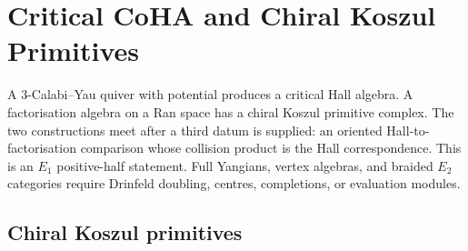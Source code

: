 \providecommand{\CoHA}{\mathrm{CoHA}}
\providecommand{\Prim}{\mathrm{Prim}}
\providecommand{\coLie}{\mathrm{coLie}}
\providecommand{\Bar}{\mathrm{Bar}}
\providecommand{\coBar}{\Omega}
\providecommand{\Ran}{\mathrm{Ran}}
\providecommand{\Fact}{\mathrm{Fact}}
\providecommand{\Chiral}{\mathrm{Chiral}}
\providecommand{\Lie}{\mathrm{Lie}}
\providecommand{\Crit}{\mathrm{Crit}}
\providecommand{\Jac}{\mathrm{Jac}}
\providecommand{\BPS}{\mathrm{BPS}}
\providecommand{\BM}{\mathrm{BM}}
\providecommand{\Rep}{\mathrm{Rep}}
\providecommand{\GL}{\mathrm{GL}}
\providecommand{\DDrin}{\mathcal{D}}
\providecommand{\Mm}{\mathfrak{M}}
\providecommand{\Ff}{\mathcal{F}}
\providecommand{\Hh}{\mathcal{H}}
\providecommand{\Yplus}{Y^{+}}
\providecommand{\cW}{\mathcal{W}}
\providecommand{\cZ}{\mathcal{Z}}
\providecommand{\Oo}{\mathcal{O}}
\providecommand{\C}{\mathbb{C}}
\providecommand{\Z}{\mathbb{Z}}
\providecommand{\QQ}{\mathbb{Q}}
\providecommand{\Eone}{E_{1}}
\providecommand{\Etwo}{E_{2}}
\providecommand{\kch}{\kappa_{\mathrm{ch}}}
\providecommand{\kcat}{\kappa_{\mathrm{cat}}}
\providecommand{\kBKM}{\kappa_{\mathrm{BKM}}}
\providecommand{\kfib}{\kappa_{\mathrm{fiber}}}
\providecommand{\gghat}{\widehat{\mathfrak{gl}}_{1}}
\providecommand{\phiW}{\varphi_{W}}

\section{Critical CoHA and Chiral Koszul Primitives}
\label{sec:fg-ks-chiral-critical}

A $3$-Calabi--Yau quiver with potential produces a critical Hall algebra. A
factorisation algebra on a Ran space has a chiral Koszul primitive complex. The
two constructions meet after a third datum is supplied: an oriented
Hall-to-factorisation comparison whose collision product is the Hall
correspondence. This is an $\Eone$ positive-half statement. Full Yangians,
vertex algebras, and braided $\Etwo$ categories require Drinfeld doubling,
centres, completions, or evaluation modules.

\subsection{Chiral Koszul primitives}
\label{subsec:fg-chiral-koszul}

